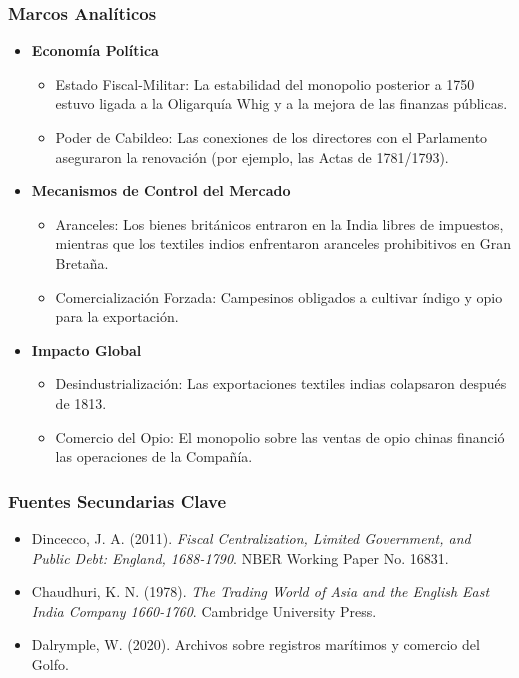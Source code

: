 \documentclass[a4paper,12pt]{article}
\begin{document}
\subsubsection*{Marcos Analíticos}

\begin{itemize}
    \item \textbf{Economía Política}
    \begin{itemize}
        \item Estado Fiscal-Militar: La estabilidad del monopolio posterior a 1750 estuvo ligada a la Oligarquía Whig y a la mejora de las finanzas públicas\cite{ref1,ref6}.
        \item Poder de Cabildeo: Las conexiones de los directores con el Parlamento aseguraron la renovación (por ejemplo, las Actas de 1781/1793)\cite{ref1,ref5}.
    \end{itemize}
    \item \textbf{Mecanismos de Control del Mercado}
    \begin{itemize}
        \item Aranceles: Los bienes británicos entraron en la India libres de impuestos, mientras que los textiles indios enfrentaron aranceles prohibitivos en Gran Bretaña\cite{ref2,ref7}.
        \item Comercialización Forzada: Campesinos obligados a cultivar índigo y opio para la exportación\cite{ref7}.
    \end{itemize}
    \item \textbf{Impacto Global}
    \begin{itemize}
        \item Desindustrialización: Las exportaciones textiles indias colapsaron después de 1813\cite{ref2}.
        \item Comercio del Opio: El monopolio sobre las ventas de opio chinas financió las operaciones de la Compañía\cite{ref8}.
    \end{itemize}
\end{itemize}

\subsubsection*{Fuentes Secundarias Clave}

\begin{itemize}
    \item Dincecco, J. A. (2011). \textit{Fiscal Centralization, Limited Government, and Public Debt: England, 1688-1790}. NBER Working Paper No. 16831\cite{ref1,ref6}.
    \item Chaudhuri, K. N. (1978). \textit{The Trading World of Asia and the English East India Company 1660-1760}\cite{ref4}. Cambridge University Press.
    \item Dalrymple, W. (2020). Archivos sobre registros marítimos y comercio del Golfo\cite{ref3}.
\end{itemize}
\end{document}
